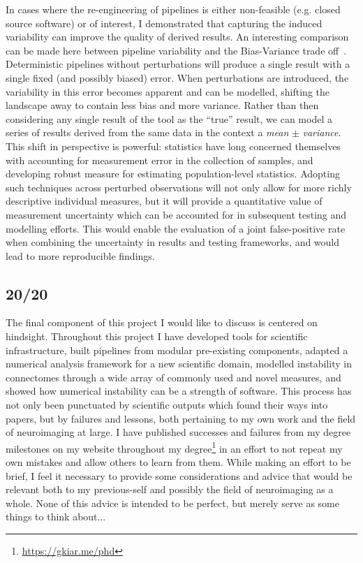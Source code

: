 In cases where the re-engineering of pipelines is either non-feasible (e.g. closed source software) or of
interest, I demonstrated that capturing the induced variability can improve the quality of derived results. An
interesting comparison can be made here between pipeline variability and the Bias-Variance
trade off~\cite{jain2000statistical}. Deterministic pipelines without perturbations will produce a single result
with a single fixed (and possibly biased) error. When perturbations are introduced, the variability in this
error becomes apparent and can be modelled, shifting the landscape away to contain less bias and more variance.
Rather than then considering any single result of the tool as the ``true'' result, we can model a series of
results derived from the same data in the context a \textit{mean} $\pm$ \textit{variance}. This shift in
perspective is powerful: statistics have long concerned themselves with accounting for measurement error in the
collection of samples, and developing robust measure for estimating population-level statistics. Adopting such
techniques across perturbed observations will not only allow for more richly descriptive individual
measures, but it will provide a quantitative value of measurement uncertainty which can be accounted for
in subsequent testing and modelling efforts. This would enable the evaluation of a joint false-positive rate
when combining the uncertainty in results and testing frameworks, and would lead to more reproducible findings.

\subsection{20/20}
The final component of this project I would like to discuss is centered on hindsight. Throughout this project I
have developed tools for scientific infrastructure, built pipelines from modular pre-existing components,
adapted a numerical analysis framework for a new scientific domain, modelled instability in connectomes through
a wide array of commonly used and novel measures, and showed how numerical instability can be a strength of
software. This process has not only been punctuated by scientific outputs which found their ways into papers,
but by failures and lessons, both pertaining to my own work and the field of neuroimaging at large. I have
published successes and failures from my degree milestones on my website throughout my
degree\footnote{\url{https://gkiar.me/phd}} in an effort to not repeat my own mistakes and allow others to learn
from them. While making an effort to be brief, I feel it necessary to provide some considerations and advice that
would be relevant both to my previous-self and possibly the field of neuroimaging as a whole. None of this advice
is intended to be perfect, but merely serve as some things to think about...

